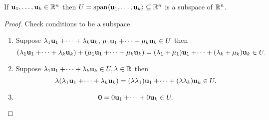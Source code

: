 \documentclass[10pt, a4paper]{article}
\begin{document}
\begin{lemma}
    If $\mathbf{u}_1, \dotsc, \mathbf{u}_k \in \mathbb{R} ^ n$ then $U = \mathrm{span}\langle\mathbf{u}_1, \dotsc, \mathbf{u}_k\rangle \subseteq \mathbb{R} ^ n$ is a subspace of $\mathbb{R} ^ n$.
    \begin{proof}
        Check conditions to be a subspace
        \begin{enumerate}[label = (\roman*)]
            \item Suppose $\lambda_1\mathbf{u}_1 + \dotsi + \lambda_k\mathbf{u}_k$, $\mu_1\mathbf{u}_1 + \dotsi + \mu_k\mathbf{u}_k \in U$ then
            \[
            (\lambda_1\mathbf{u}_1 + \dotsi + \lambda_k\mathbf{u}_k) + (\mu_1\mathbf{u}_1 + \dotsi + \mu_k\mathbf{u}_k) = (\lambda_1 + \mu_1)\mathbf{u}_1 + \dotsi + (\lambda_k + \mu_k)\mathbf{u}_k \in U.
            \]
            \item Suppose $\lambda_1\mathbf{u}_1 + \dotsi + \lambda_k\mathbf{u}_k \in U, \lambda \in \mathbb{R}$ then
            \[
            \lambda(\lambda_1\mathbf{u}_1 + \dotsi + \lambda_k\mathbf{u}_k) = (\lambda\lambda_1)\mathbf{u}_1 + \dotsi + (\lambda\lambda_k)\mathbf{u}_k \in U.
            \]
            \item
            \[
            \mathbf{0} = 0\mathbf{u}_1 + \dotsi + 0\mathbf{u}_k \in U.
            \]
        \end{enumerate}
    \end{proof}
\end{lemma}
\end{document}
